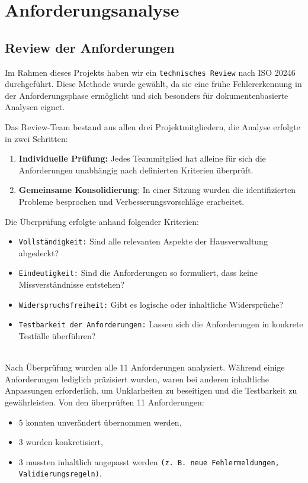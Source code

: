 \newpage


\section{Anforderungsanalyse}\label{sec:anforderungsanalyse}

\subsection{Review der Anforderungen}\label{subsec:review-der-anforderungen}


Im Rahmen dieses Projekts haben wir ein \texttt{technisches Review} nach ISO 20246 durchgeführt.
Diese Methode wurde gewählt, da sie eine frühe Fehlererkennung in der Anforderungsphase ermöglicht und sich besonders für dokumentenbasierte Analysen eignet.

Das Review-Team bestand aus allen drei Projektmitgliedern, die Analyse erfolgte in zwei Schritten:
\begin{enumerate}
    \item \textbf{Individuelle Prüfung:} Jedes Teammitglied hat alleine für sich die Anforderungen unabhängig nach definierten Kriterien überprüft.
    \item \textbf{Gemeinsame Konsolidierung}: In einer Sitzung wurden die identifizierten Probleme besprochen und Verbesserungsvorschläge erarbeitet.
\end{enumerate}

Die Überprüfung erfolgte anhand folgender Kriterien:
\begin{itemize}[noitemsep, topsep=0pt, parsep=0pt, partopsep=0pt]
    \item \texttt{Vollständigkeit:} Sind alle relevanten Aspekte der Hausverwaltung abgedeckt?
    \item \texttt{Eindeutigkeit:} Sind die Anforderungen so formuliert, dass keine Missverständnisse entstehen?
    \item \texttt{Widerspruchsfreiheit:} Gibt es logische oder inhaltliche Widersprüche?
    \item \texttt{Testbarkeit der Anforderungen:} Lassen sich die Anforderungen in konkrete Testfälle überführen?
\end{itemize}
\\
Nach Überprüfung wurden alle 11 Anforderungen analysiert.
Während einige Anforderungen lediglich präzisiert wurden, waren bei anderen inhaltliche Anpassungen erforderlich, um Unklarheiten zu beseitigen und die Testbarkeit zu gewährleisten.
Von den überprüften 11 Anforderungen:
\begin{itemize}
    \item 5 konnten unverändert übernommen werden,
    \item 3 wurden konkretisiert,
    \item 3 mussten inhaltlich angepasst werden \texttt{(z. B. neue Fehlermeldungen, Validierungsregeln)}.
\end{itemize}

